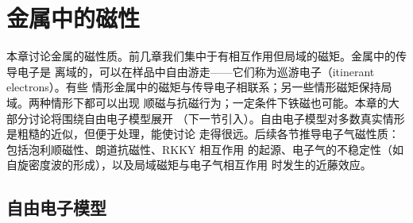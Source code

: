 \chapter{金属中的磁性}

本章讨论金属的磁性质。前几章我们集中于有相互作用但局域的磁矩。金属中的传导电子是
离域的，可以在样品中自由游走——它们称为巡游电子（itinerant electrons）。有些
情形金属中的磁矩与传导电子相联系；另一些情形磁矩保持局域。两种情形下都可以出现
顺磁与抗磁行为；一定条件下铁磁也可能。本章的大部分讨论将围绕自由电子模型展开
（下一节引入）。自由电子模型对多数真实情形是粗糙的近似，但便于处理，能使讨论
走得很远。后续各节推导电子气磁性质：包括泡利顺磁性、朗道抗磁性、RKKY 相互作用
的起源、电子气的不稳定性（如自旋密度波的形成），以及局域磁矩与电子气相互作用
时发生的近藤效应。

\section{自由电子模型}

